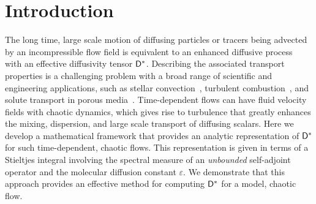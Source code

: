 \documentclass[amsa]{ipart}
\begin{document}
\section{Introduction}\label{sec:Introduction}
The long time, large scale motion of diffusing particles or tracers
being advected by an incompressible flow field is equivalent to an
enhanced diffusive process~\cite{Taylor:PRSL:196} with an effective
diffusivity tensor $\mathsf{D}^*$. Describing the associated 
transport properties is a challenging problem with a broad range of
scientific and engineering applications, such as stellar
convection~\cite{Knobloch:1992ApJ,Press:1981:ApJ,canut98,canut98b,canut00},
turbulent
combustion~\cite{Aslanyan:BF00790149,Bilger:05:10.1016,Tabaczynski:1990:243,Williams:1985:TC:9781611971064,Peters:2000:TC:9780521660822,Xin:2009:Fronts:9780387876832},
and solute transport in porous
media~\cite{Bhattacharya:AAP:1999:951,Bhattacharya:1989:ASD,Whitaker:AIC690130308,Gupta:WRCR3940,Koch:1988:965,Lester:PRL:111.174101,Koch:JFM:7961001}.
Time-dependent flows can have fluid velocity fields with chaotic
dynamics, which gives rise to turbulence that greatly enhances the
mixing, dispersion, and large scale transport of diffusing
scalars. Here we develop a mathematical framework that provides an
analytic representation of $\mathsf{D}^*$ for such time-dependent, chaotic
flows. This representation is given in terms of a Stieltjes integral
involving the spectral measure of an \emph{unbounded} self-adjoint
operator and the molecular diffusion constant $\varepsilon$. We demonstrate that
this approach provides an effective method for computing $\mathsf{D}^*$ for a
model, chaotic flow.  
\end{document}
